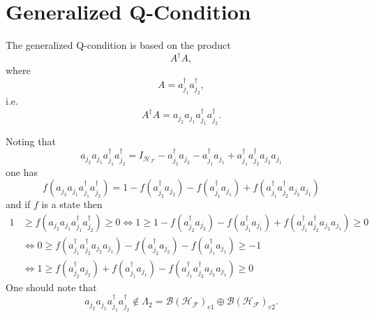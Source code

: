\documentclass[aps,preprint]{revtex4}%
\begin{document}
\section{Generalized Q-Condition}

The generalized Q-condition is based on the product
\begin{equation}
A^{\dagger}A,
\end{equation}
where
\begin{equation}
A=a_{j_{1}}^{\dagger}a_{j_{2}}^{\dagger},
\end{equation}
i.e.%
\begin{equation}
A^{\dagger}A=a_{j_{2}}a_{j_{1}}a_{j_{1}}^{\dagger}a_{j_{2}}^{\dagger}.
\end{equation}


Noting that
\begin{equation}
a_{j_{2}}a_{j_{1}}a_{j_{1}}^{\dagger}a_{j_{2}}^{\dagger}=I_{\mathcal{H}%
_{\mathcal{F}}}-a_{j_{2}}^{\dagger}a_{j_{2}}-a_{j_{1}}^{\dagger}a_{j_{1}%
}+a_{j_{1}}^{\dagger}a_{j_{2}}^{\dagger}a_{j_{2}}a_{j_{1}}%
\end{equation}
one has
\begin{equation}
f\left(  a_{j_{2}}a_{j_{1}}a_{j_{1}}^{\dagger}a_{j_{2}}^{\dagger}\right)
=1-f\left(  a_{j_{2}}^{\dagger}a_{j_{2}}\right)  -f\left(  a_{j_{1}}^{\dagger
}a_{j_{1}}\right)  +f\left(  a_{j_{1}}^{\dagger}a_{j_{2}}^{\dagger}a_{j_{2}%
}a_{j_{1}}\right)
\end{equation}
and if $f$ is a state then
\begin{align}
1  &  \geq f\left(  a_{j_{2}}a_{j_{1}}a_{j_{1}}^{\dagger}a_{j_{2}}^{\dagger
}\right)  \geq0\Leftrightarrow1\geq1-f\left(  a_{j_{2}}^{\dagger}a_{j_{2}%
}\right)  -f\left(  a_{j_{1}}^{\dagger}a_{j_{1}}\right)  +f\left(  a_{j_{1}%
}^{\dagger}a_{j_{2}}^{\dagger}a_{j_{2}}a_{j_{1}}\right)  \geq0\nonumber\\
&  \Leftrightarrow0\geq f\left(  a_{j_{1}}^{\dagger}a_{j_{2}}^{\dagger
}a_{j_{2}}a_{j_{1}}\right)  -f\left(  a_{j_{2}}^{\dagger}a_{j_{2}}\right)
-f\left(  a_{j_{1}}^{\dagger}a_{j_{1}}\right)  \geq-1\nonumber\\
&  \Leftrightarrow1\geq f\left(  a_{j_{2}}^{\dagger}a_{j_{2}}\right)
+f\left(  a_{j_{1}}^{\dagger}a_{j_{1}}\right)  -f\left(  a_{j_{1}}^{\dagger
}a_{j_{2}}^{\dagger}a_{j_{2}}a_{j_{1}}\right)  \geq0
\end{align}
One should note that
\begin{equation}
a_{j_{2}}a_{j_{1}}a_{j_{1}}^{\dagger}a_{j_{2}}^{\dagger}\notin\Lambda
_{2}=\mathcal{B}\left(  \mathcal{H}_{\mathcal{F}}\right)  _{e1}\oplus
\mathcal{B}\left(  \mathcal{H}_{\mathcal{F}}\right)  _{e2}.
\end{equation}
\end{document}
